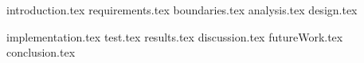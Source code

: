 

{introduction.tex}
{requirements.tex}
{boundaries.tex}
{analysis.tex}
{design.tex}

{implementation.tex}
{test.tex}
{results.tex}
{discussion.tex}
{futureWork.tex}
{conclusion.tex}

%

